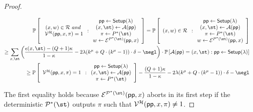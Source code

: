 \begin{proof}
	 \begin{small}
 \begin{align*}
	\mathbb{P} \left[
	\begin{array}{c} 
	(x,w) \in \mathcal{R} \ and \\\ 
    \verifier^\mathcal{H}(\crs, x, \pi) = 1 
	\end{array} : 
	\begin{array}{c}
	\crs \gets \setup(\lambda) \\
	(x, \st) \gets \mathcal{A}(\crs) \\ 
	\pi \gets P^*(\st) \\ 
	w \gets \mathcal{E}^{P^*(\st)}(\crs, x) 
	\end{array}
 \right] = \mathbb{P} \left[
	\begin{array}{c} 
	(x,w) \in \mathcal{R}  
	\end{array} : 
	\begin{array}{c}
	\crs \gets \setup(\lambda) \\
	(x, \st) \gets \mathcal{A}(\crs) \\ 
	\pi \gets P^*(\st) \\ 
	w \gets \mathcal{E}^{P^*(\st)}(\crs, x) 
	\end{array}
 \right] \\   
 \geq \sum_{x, \st} \left(\frac{\epsilon(x, \st) - (Q+1)\kappa}{1-\kappa} - 2\lambda (k^\mu + Q \cdot (k^\mu - 1))\cdot \delta - \negl\right) \cdot \mathbb{P} \left[ \mathcal{A}(\crs) = (x, \st) :
	\crs \gets \setup(\lambda) \right] \\
 \geq \mathbb{P} \left[
	\begin{array}{c} 
	\verifier^\mathcal{H}(\crs, x, \pi) = 1 
	\end{array} : 
	\begin{array}{c}
	\crs \gets \setup(\lambda) \\
	(x, \st) \gets \mathcal{A}(\crs) \\ 
	\pi \gets P^*(\st) \\ 
	\end{array}
 \right] - \frac{(Q+1)\kappa}{1- \kappa} -2\lambda (k^\mu + Q \cdot (k^\mu - 1)) \cdot \delta - \negl
	\end{align*}
	\end{small}

The first equality holds because $\mathcal{E}^{\prover^*(\st)}(\crs, x)$ aborts in its first step if the deterministic $\prover^*(\st)$ outputs $\pi$ such that $\mathcal{V}^\mathcal{H}(\textsf{pp}, x, \pi) \neq 1$. %
	 \end{proof}





